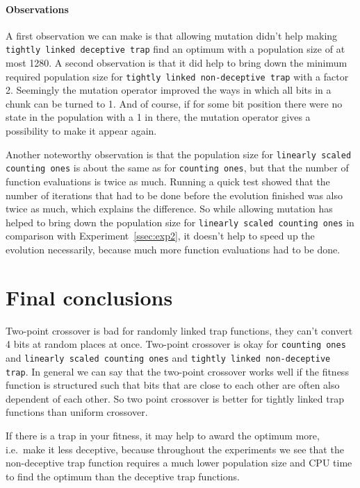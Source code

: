 \documentclass[12pt]{article}
\theoremstyle{definition}
\newcommand{\co}{\texttt{counting ones}}
\newcommand{\lsco}{\texttt{linearly scaled counting ones}}
\newcommand{\tdt}{\texttt{tightly linked deceptive trap}}
\newcommand{\tnt}{\texttt{tightly linked non-deceptive trap}}
\begin{document}
\paragraph{Observations}
A first observation we can make is that allowing mutation didn't help making \tdt{} find
an optimum with a population size of at most 1280.
A second observation is that it did help to bring down the minimum required population size
for \tnt{} with a factor 2.
Seemingly the mutation operator improved the ways in which all bits in a chunk can be turned to 1.
And of course, if for some bit position there were no state in the population with a 1 in there,
the mutation operator gives a possibility to make it appear again.

Another noteworthy observation is that the population size for \lsco{} is about the same
as for \co{}, but that the number of function evaluations is twice as much.
Running a quick test showed that the number of iterations that had to be done before the
evolution finished was also twice as much, which explains the difference.
So while allowing mutation has helped to bring down the population size for \lsco{}
in comparison with Experiment~\ref{ssec:exp2},
it doesn't help to speed up the evolution necessarily, because much more
function evaluations had to be done.


\section*{Final conclusions}

Two-point crossover is bad for randomly linked trap functions, they can't convert 4 bits at
random places at once.
Two-point crossover is okay for \co{} and \lsco{} and \tnt{}.
In general we can say that the two-point crossover works well if the fitness function is
structured such that bits that are close to each other are often also dependent of each other.
So two point crossover is better for tightly linked trap functions than uniform crossover.

If there is a trap in your fitness, it may help to award the optimum more,
i.e.\ make it less deceptive, because throughout the experiments we see that the
non-deceptive trap function requires a much lower population size and CPU time to find
the optimum than the deceptive trap functions.
\end{document}

